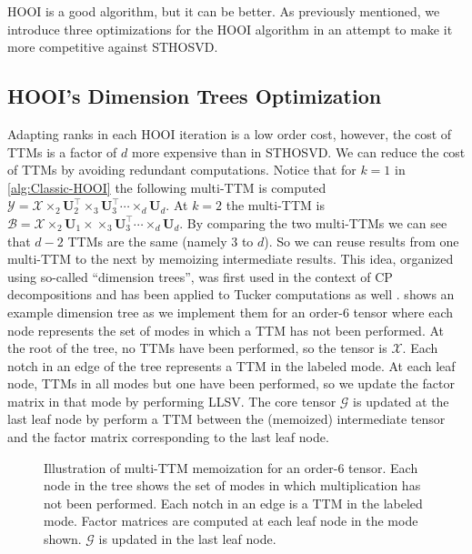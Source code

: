     HOOI is a good algorithm, but it can be better. As previously mentioned, we
    introduce three optimizations for the HOOI algorithm in an attempt to make
    it more competitive against STHOSVD. 

\subsection{HOOI's Dimension Trees Optimization}
    Adapting ranks in each HOOI iteration is a low order cost, however, the cost
    of TTMs is a factor of $d$ more expensive than in STHOSVD. We can reduce the
    cost of TTMs by avoiding redundant computations. Notice that for $k = 1$ in
    \cref{alg:Classic-HOOI} the following multi-TTM is computed $\mathcal{Y} =
    \mathcal{X} \times_2 \mathbf{U}_{2}^\intercal \times_3
    \mathbf{U}_{3}^\intercal \cdots \times_d \mathbf{U}_{d}$. At $k = 2$ the
    multi-TTM is $\mathcal{B} = \mathcal{X} \times_2 \mathbf{U}_{1}\times
    \times_3 \mathbf{U}_{3}^\intercal \cdots \times_d \mathbf{U}_{d}$. By
    comparing the two multi-TTMs we can see that $d - 2$ TTMs are the same
    (namely 3 to $d$). So we can reuse results from one multi-TTM to the next by
    memoizing intermediate results. This idea, organized using so-called
    ``dimension trees'', was first used in the context of CP decompositions
    \cite{PTC13a} and has been applied to Tucker computations as well
    \cite{kaya2019computing,MLB24}.  shows an example
    dimension tree as we implement them for an order-$6$ tensor where each node
    represents the set of modes in which a TTM has not been performed. At the
    root of the tree, no TTMs have been performed, so the tensor is $\mathcal{X}$.
    Each notch in an edge of the tree represents a TTM in the labeled mode. At
    each leaf node, TTMs in all modes but one have been performed, so we update
    the factor matrix in that mode by performing LLSV. The core tensor $\mathcal{G}$
    is updated at the last leaf node by perform a TTM between the (memoized)
    intermediate tensor and the factor matrix corresponding to the last leaf
    node.

    \begin{figure}
        \centering
        
        \label{fig:dimtree}
        \caption[A 6-way Dimension Tree]{Illustration of multi-TTM memoization
        for an order-$6$ tensor. Each node in the tree shows the set of modes in
        which multiplication has not been performed. Each notch in an edge is a
        TTM in the labeled mode.  Factor matrices are computed at each leaf node
        in the mode shown. $\mathcal{G}$ is updated in the last leaf node.}
    \end{figure}

